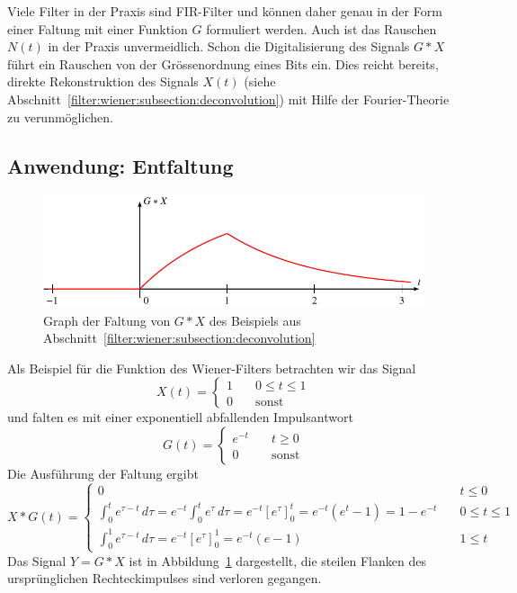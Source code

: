 Viele Filter in der Praxis sind FIR-Filter und können daher genau
in der Form einer Faltung mit einer Funktion $G$ formuliert werden.
Auch ist das Rauschen $N(t)$ in der Praxis unvermeidlich.
Schon die Digitalisierung des Signals $G*X$ führt ein Rauschen von der
Grössenordnung eines Bits ein.
Dies reicht bereits, direkte Rekonstruktion des Signals $X(t)$ (siehe
Abschnitt~\ref{filter:wiener:subsection:deconvolution}) mit
Hilfe der Fourier-Theorie zu verunmöglichen.

%
%
\subsection{Anwendung: Entfaltung
\label{filter:wiener:subsection:deconvolution}}
\begin{figure}
\centering
\includegraphics{8-filter/images/faltung.pdf}
\caption{Graph der Faltung von $G*X$ des Beispiels aus
Abschnitt~\ref{filter:wiener:subsection:deconvolution}
\label{filter:wiener:faltung:graph}}
\end{figure}
Als Beispiel für die Funktion des Wiener-Filters betrachten wir das Signal 
\[
X(t) = \begin{cases}
1&\quad 0\le t\le 1\\
0&\quad\text{sonst}
\end{cases}
\]
und falten es mit einer exponentiell abfallenden Impulsantwort
\[
G(t)
=
\begin{cases}
e^{-t}&\quad t \ge 0\\
0&\quad \text{sonst}
\end{cases}
\]
Die Ausführung der Faltung ergibt
\begin{equation}
X*G(t)
=
\begin{cases}
0&\quad t\le 0
\\[10pt]
\displaystyle
\int_0^t e^{\tau-t}\,d\tau
=
e^{-t}
\int_0^t e^{\tau}\,d\tau
=
e^{-t}[e^\tau]_0^t
=
e^{-t}(e^t-1)
=
1-e^{-t}
&\quad 0\le t\le 1
\\[10pt]
\displaystyle
\int_0^1 e^{\tau-t}\,d\tau
=
e^{-t}[e^\tau]_0^1
=
e^{-t}(e-1)
&\quad 1\le t
\end{cases}
\end{equation}
Das Signal $Y=G*X$ ist in Abbildung~\ref{filter:wiener:faltung:graph}
dargestellt, die steilen Flanken des ursprünglichen Rechteckimpulses
sind verloren gegangen.

